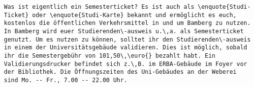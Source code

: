 \begin{verbatim}
Was ist eigentlich ein Semesterticket? Es ist auch als \enquote{Studi-Ticket} oder \enquote{Studi-Karte} bekannt und ermöglicht es euch, kostenlos die öffentlichen Verkehrsmittel in und um Bamberg zu nutzen.  In Bamberg wird euer Studierenden\-ausweis u.\,a. als Semesterticket genutzt. Um es nutzen zu können, solltet ihr den Studierenden\-ausweis in einem der Universitätsgebäude validieren. Dies ist möglich, sobald ihr die Semestergebühr von 101,50\,\euro{} bezahlt habt. Ein Validierungsdrucker befindet sich z.\,B. im ERBA-Gebäude im Foyer vor der Bibliothek. Die Öffnungszeiten des Uni-Gebäudes an der Weberei sind Mo. -- Fr., 7.00 -- 22.00 Uhr. 
\end{verbatim}

